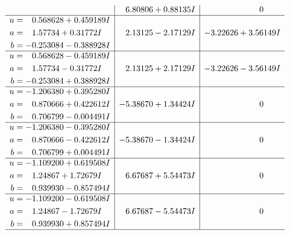 \documentclass[1p]{elsarticle_modified}
\theoremstyle{definition}
\begin{document}
$$\begin{array}{c|c|c}
 & \phantom{-}6.80806 + 0.88135 I & \phantom{-0.000000 } 0 \\ \hline\begin{aligned}
u &= \phantom{-}0.568628 + 0.459189 I \\
a &= \phantom{-}1.57734 + 0.31772 I \\
b &= -0.253084 - 0.388928 I\end{aligned}
 & \phantom{-}2.13125 - 2.17129 I & -3.22626 + 3.56149 I \\ \hline\begin{aligned}
u &= \phantom{-}0.568628 - 0.459189 I \\
a &= \phantom{-}1.57734 - 0.31772 I \\
b &= -0.253084 + 0.388928 I\end{aligned}
 & \phantom{-}2.13125 + 2.17129 I & -3.22626 - 3.56149 I \\ \hline\begin{aligned}
u &= -1.206380 + 0.395280 I \\
a &= \phantom{-}0.870666 + 0.422612 I \\
b &= \phantom{-}0.706799 - 0.004491 I\end{aligned}
 & -5.38670 + 1.34424 I & \phantom{-0.000000 } 0 \\ \hline\begin{aligned}
u &= -1.206380 - 0.395280 I \\
a &= \phantom{-}0.870666 - 0.422612 I \\
b &= \phantom{-}0.706799 + 0.004491 I\end{aligned}
 & -5.38670 - 1.34424 I & \phantom{-0.000000 } 0 \\ \hline\begin{aligned}
u &= -1.109200 + 0.619508 I \\
a &= \phantom{-}1.24867 + 1.72679 I \\
b &= \phantom{-}0.939930 - 0.857494 I\end{aligned}
 & \phantom{-}6.67687 + 5.54473 I & \phantom{-0.000000 } 0 \\ \hline\begin{aligned}
u &= -1.109200 - 0.619508 I \\
a &= \phantom{-}1.24867 - 1.72679 I \\
b &= \phantom{-}0.939930 + 0.857494 I\end{aligned}
 & \phantom{-}6.67687 - 5.54473 I & \phantom{-0.000000 } 0\\
 \hline 
 \end{array}$$\newpage$$\begin{array}{c|c|c}  

\end{array}$$
\end{document}
